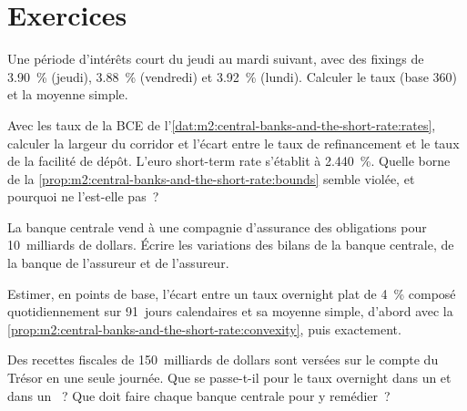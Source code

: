 \section{Exercices}

\begin{exercise}[$\star$]\label{exo:m2:central-banks-and-the-short-rate:1}
Une période d'intérêts court du jeudi au mardi suivant, avec des fixings
de 3.90~\% (jeudi), 3.88~\% (vendredi) et 3.92~\% (lundi). Calculer le taux
 (base 360) et la moyenne simple.
\end{exercise}

\begin{exercise}[$\star$]\label{exo:m2:central-banks-and-the-short-rate:2}
Avec les taux de la BCE de l'\cref{dat:m2:central-banks-and-the-short-rate:rates},
calculer la largeur du corridor et l'écart entre le taux de refinancement
et le taux de la facilité de dépôt. L'euro short-term rate s'établit à 2.440~\%. Quelle
borne de la \cref{prop:m2:central-banks-and-the-short-rate:bounds} semble
violée, et pourquoi ne l'est-elle pas~?
\end{exercise}

\begin{exercise}[$\star$]\label{exo:m2:central-banks-and-the-short-rate:3}
La banque centrale vend à une compagnie d'assurance des obligations pour
10~milliards de dollars. Écrire les variations des bilans de la banque centrale,
de la banque de l'assureur et de l'assureur.
\end{exercise}

\begin{exercise}[$\star\star$]\label{exo:m2:central-banks-and-the-short-rate:4}
Estimer, en points de base, l'écart entre un taux overnight plat de 4~\% composé
quotidiennement sur 91~jours calendaires et sa moyenne simple, d'abord avec la
\cref{prop:m2:central-banks-and-the-short-rate:convexity}, puis exactement.
\end{exercise}

\begin{exercise}[$\star\star$]\label{exo:m2:central-banks-and-the-short-rate:5}
Des recettes fiscales de 150~milliards de dollars sont versées sur le compte
du Trésor en une seule journée. Que se passe-t-il pour le taux overnight dans
un  et dans un ~? Que doit faire chaque banque centrale pour y remédier~?
\end{exercise}

